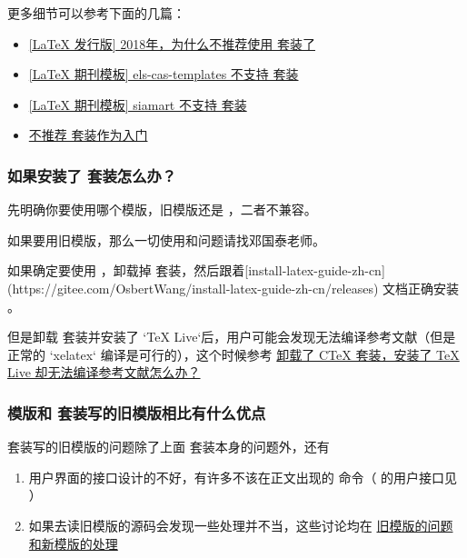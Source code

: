 更多细节可以参考下面的几篇：

\begin{itemize}
  \item \href{https://zhuanlan.zhihu.com/p/45174503}{[LaTeX 发行版] 2018年，为什么不推荐使用 \CTeX 套装了}
  \item \href{https://zhuanlan.zhihu.com/p/73304856}{[LaTeX 期刊模板] els-cas-templates 不支持 \CTeX 套装}
  \item \href{https://zhuanlan.zhihu.com/p/112637535}{[LaTeX 期刊模板] siamart 不支持 \CTeX 套装}
  \item \href{https://tieba.baidu.com/p/2665622350}{不推荐 \CTeX 套装作为入门}
\end{itemize}


\subsubsection{如果安装了 \CTeX 套装怎么办？}

先明确你要使用哪个模版，旧模版还是 ，二者不兼容。

如果要用旧模版，那么一切使用和问题请找邓国泰老师。

如果确定要使用 ，卸载掉 \CTeX 套装，然后跟着[install-latex-guide-zh-cn](https://gitee.com/OsbertWang/install-latex-guide-zh-cn/releases) 文档正确安装 \TeXLive 。


但是卸载 \CTeX 套装并安装了 `TeX Live`后，用户可能会发现无法编译参考文献（但是正常的 `xelatex` 编译是可行的），这个时候参考
\href{https://gitee.com/xkwxdyy/CCNUthesis/wikis/%E5%8D%B8%E8%BD%BD%E4%BA%86CTeX%E5%A5%97%E8%A3%85%E5%AE%89%E8%A3%85%E4%BA%86TeXLive%E5%8D%B4%E6%97%A0%E6%B3%95%E7%BC%96%E8%AF%91%E5%8F%82%E8%80%83%E6%96%87%E7%8C%AE}{卸载了 CTeX 套装，安装了 TeX Live 却无法编译参考文献怎么办？}


\subsubsection{ 模版和 \CTeX 套装写的旧模版相比有什么优点}

\CTeX 套装写的旧模版的问题除了上面 \CTeX 套装本身的问题外，还有
\begin{enumerate}
  \item 用户界面的接口设计的不好，有许多不该在正文出现的  命令（ 的用户接口见 ）
  \item 如果去读旧模版的源码会发现一些处理并不当，这些讨论均在 \href{https://gitee.com/xkwxdyy/CCNUthesis/wikis/%E6%97%A7%E6%A8%A1%E7%89%88%E7%9A%84%E9%97%AE%E9%A2%98%E5%92%8C%E6%96%B0%E6%A8%A1%E7%89%88%E7%9A%84%E5%A4%84%E7%90%86}{旧模版的问题和新模版的处理}
\end{enumerate}

